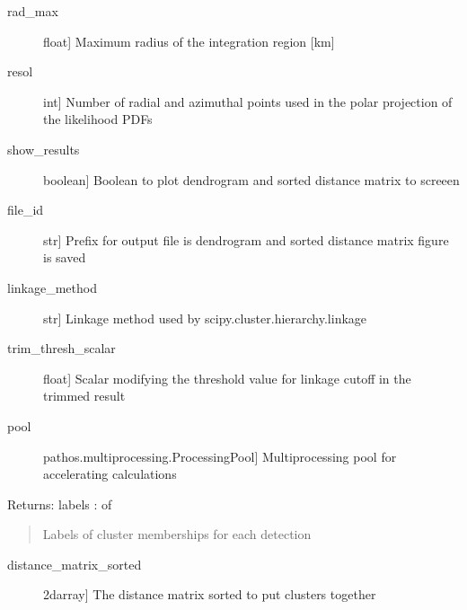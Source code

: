 \documentclass[letterpaper,10pt,english]{sphinxmanual}
\begin{document}
\begin{fulllineitems}
\begin{description}
\item[{rad\_max}] \leavevmode{[}float{]}
Maximum radius of the integration region {[}km{]}

\item[{resol}] \leavevmode{[}int{]}
Number of radial and azimuthal points used in the polar projection of the likelihood PDFs

\item[{show\_results}] \leavevmode{[}boolean{]}
Boolean to plot dendrogram and sorted distance matrix to screeen

\item[{file\_id}] \leavevmode{[}str{]}
Prefix for output file is dendrogram and sorted distance matrix figure is saved

\item[{linkage\_method}] \leavevmode{[}str{]}
Linkage method used by scipy.cluster.hierarchy.linkage

\item[{trim\_thresh\_scalar}] \leavevmode{[}float{]}
Scalar modifying the threshold value for linkage cutoff in the trimmed result

\item[{pool}] \leavevmode{[}pathos.multiprocessing.ProcessingPool{]}
Multiprocessing pool for accelerating calculations

\end{description}

Returns:
labels :  of 
\begin{quote}

Labels of cluster memberships for each detection
\end{quote}
\begin{description}
\item[{distance\_matrix\_sorted}] \leavevmode{[}2darray{]}
The distance matrix sorted to put clusters together

\end{description}

\end{fulllineitems}

\end{document}
